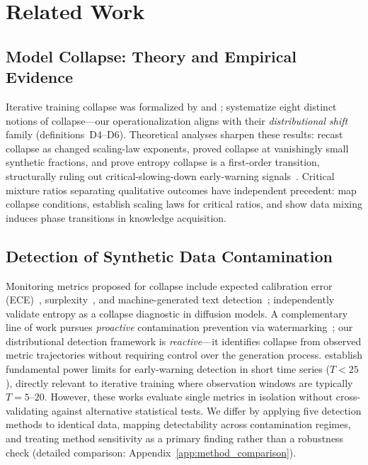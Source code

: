 \FloatBarrier
\section{Related Work}
\label{sec:related_work}

\subsection{Model Collapse: Theory and Empirical Evidence}
\label{sec:rw_collapse}

Iterative training collapse was formalized by \citet{shumailov2024curse} and \citet{alemohammad2024mad}; \citet{schaeffer2025position} systematize eight distinct notions of collapse---our operationalization aligns with their \emph{distributional shift} family (definitions~D4--D6).
Theoretical analyses sharpen these results: \citet{dohmatob2024tale} recast collapse as changed scaling-law exponents, \citet{dohmatob2025strong} proved collapse at vanishingly small synthetic fractions, and \citet{truong2026phase} prove entropy collapse is a first-order transition, structurally ruling out critical-slowing-down early-warning signals~\citep{scheffer2009early,scheffer2012anticipating}.
Critical mixture ratios separating qualitative outcomes have independent precedent: \citet{kazdan2025collapse} map collapse conditions, \citet{gu2024cmr} establish scaling laws for critical ratios, and \citet{gu2025datamixing} show data mixing induces phase transitions in knowledge acquisition.

\subsection{Detection of Synthetic Data Contamination}
\label{sec:rw_detection}

Monitoring metrics proposed for collapse include expected calibration error (ECE)~\citep{du2025scales}, surplexity~\citep{gambetta2024surplexity}, and machine-generated text detection~\citep{drayson2025detection}; \citet{shi2025closer} independently validate entropy as a collapse diagnostic in diffusion models.
A complementary line of work pursues \emph{proactive} contamination prevention via watermarking~\citep{kirchenbauer2023watermark}; our distributional detection framework is \emph{reactive}---it identifies collapse from observed metric trajectories without requiring control over the generation process.
\citet{boettiger2012limits} establish fundamental power limits for early-warning detection in short time series ($T{<}25$), directly relevant to iterative training where observation windows are typically $T{=}5$--$20$.
However, these works evaluate single metrics in isolation without cross-validating against alternative statistical tests.
We differ by applying five detection methods to identical data, mapping detectability across contamination regimes, and treating method sensitivity as a primary finding rather than a robustness check (detailed comparison: Appendix~\ref{app:method_comparison}).

